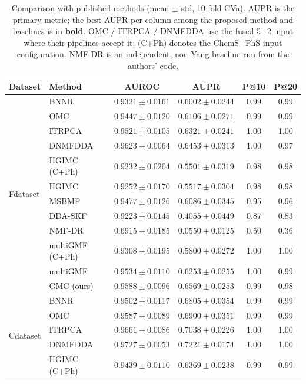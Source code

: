 \documentclass[webpdf,modern,large]{oup-authoring-template}
\begin{document}
\begin{table}[tb]
\centering
\caption{Comparison with published methods (mean $\pm$ std, 10-fold CVa). AUPR is the primary metric; the best AUPR per column among the proposed method and baselines is in \textbf{bold}. OMC / ITRPCA / DNMFDDA use the fused 5+2 input where their pipelines accept it; (C+Ph) denotes the ChemS+PhS input configuration. NMF-DR \citep{sadeghi2022} is an independent, non-Yang baseline run from the authors' code.}
\label{tab:main_results}
\small
\begin{tabular}{llcccc}
\toprule
Dataset & Method & AUROC & AUPR & P@10 & P@20 \\
\midrule
\multirow{12}{*}{Fdataset}
& BNNR & $0.9321 \pm 0.0161$ & $0.6002 \pm 0.0244$ & 0.99 & 0.99 \\
& OMC & $0.9447 \pm 0.0120$ & $0.6106 \pm 0.0271$ & 0.99 & 0.99 \\
& ITRPCA & $0.9521 \pm 0.0105$ & $0.6321 \pm 0.0241$ & 1.00 & 1.00 \\
& DNMFDDA & $0.9623 \pm 0.0064$ & $0.6453 \pm 0.0313$ & 1.00 & 0.97 \\
& HGIMC (C+Ph) & $0.9232 \pm 0.0204$ & $0.5501 \pm 0.0319$ & 0.98 & 0.98 \\
& HGIMC & $0.9252 \pm 0.0170$ & $0.5517 \pm 0.0304$ & 0.98 & 0.98 \\
& MSBMF & $0.9477 \pm 0.0126$ & $0.6086 \pm 0.0345$ & 0.95 & 0.96 \\
& DDA-SKF & $0.9223 \pm 0.0145$ & $0.4055 \pm 0.0449$ & 0.87 & 0.83 \\
& NMF-DR & $0.6915 \pm 0.0185$ & $0.0550 \pm 0.0125$ & 0.50 & 0.36 \\
& multiGMF (C+Ph) & $0.9308 \pm 0.0195$ & $0.5800 \pm 0.0272$ & 1.00 & 1.00 \\
& multiGMF & $0.9534 \pm 0.0110$ & $0.6253 \pm 0.0255$ & 1.00 & 0.99 \\
& GMC (ours) & $0.9588 \pm 0.0096$ & \textbf{$0.6569 \pm 0.0253$} & 0.99 & 0.98 \\
\midrule
\multirow{12}{*}{Cdataset}
& BNNR & $0.9502 \pm 0.0117$ & $0.6805 \pm 0.0354$ & 0.99 & 0.99 \\
& OMC & $0.9587 \pm 0.0089$ & $0.6900 \pm 0.0351$ & 0.99 & 0.99 \\
& ITRPCA & $0.9661 \pm 0.0086$ & $0.7038 \pm 0.0226$ & 1.00 & 1.00 \\
& DNMFDDA & $0.9727 \pm 0.0053$ & $0.7221 \pm 0.0174$ & 1.00 & 1.00 \\
& HGIMC (C+Ph) & $0.9439 \pm 0.0110$ & $0.6369 \pm 0.0238$ & 0.99 & 0.99 \\

\end{tabular}
\end{table}
\end{document}
